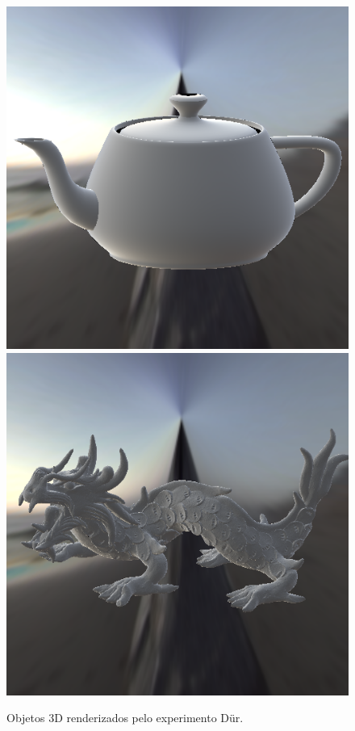 \begin{figure}[H]
    \caption{\small{Objetos 3D renderizados pelo experimento Dür.}}
    \label{fig-duer-eqlang}
  \includegraphics[width=\linewidth]{./Imagens/brdfs/duer-teapot.png}
\endminipage\hfill
{}
  \includegraphics[width=\linewidth]{./Imagens/brdfs/duer-dragon.png}

\end{figure}
